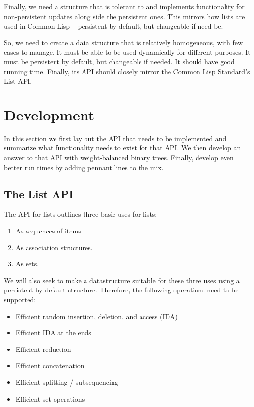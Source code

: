 \documentclass[sigconf]{acmart}
\begin{document}
Finally, we need a structure that is tolerant to and implements functionality
for non-persistent updates along side the persistent ones. This mirrors how
lists are used in Common Lisp -- persistent by default, but changeable if need
be.

So, we need to create a data structure that is relatively homogeneous, with
few cases to manage. It must be able to be used dynamically for different
purposes. It must be persistent by default, but changeable if needed. It should
have good running time. Finally, its API should closely mirror the Common Lisp
Standard's List API.

\section{Development}

In this section we first lay out the API that needs to be implemented and summarize
what functionality needs to exist for that API. We then develop an answer to
that API with weight-balanced binary trees. Finally, develop even better run
times by adding pennant lines to the mix.

\subsection{The List API}

The API for lists\cite{ANSI:1994:DPA} outlines three basic uses for lists:

\begin{enumerate}
    \item As sequences of items.
    \item As association structures.
    \item As sets.
\end{enumerate}

We will also seek to make a datastructure suitable for these three uses using a
persistent-by-default structure. Therefore, the following operations need to be
supported:

\begin{itemize}
    \item Efficient random insertion, deletion, and access (IDA)
    \item Efficient IDA at the ends
    \item Efficient reduction
    \item Efficient concatenation
    \item Efficient splitting / subsequencing
    \item Efficient set operations
\end{itemize}
\end{document}
